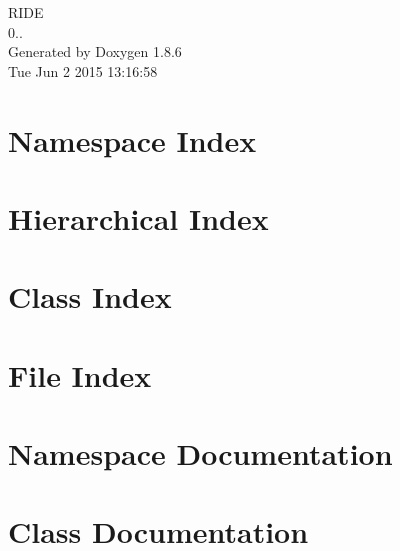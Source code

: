 \documentclass[twoside]{book}
\newcommand{\clearemptydoublepage}{%
  \newpage{\pagestyle{empty}\cleardoublepage}%
}
\begin{document}
\hypersetup{pageanchor=false}
\begin{titlepage}
\vspace*{7cm}
\begin{center}%
{\Large R\-I\-D\-E \\[1ex]\large 0.. }\\
\vspace*{1cm}
{\large Generated by Doxygen 1.8.6}\\
\vspace*{0.5cm}
{\small Tue Jun 2 2015 13:16:58}\\
\end{center}
\end{titlepage}
\clearemptydoublepage
\tableofcontents
\clearemptydoublepage
{}
\hypersetup{pageanchor=true}

\chapter{Namespace Index}

\chapter{Hierarchical Index}

\chapter{Class Index}

\chapter{File Index}

\chapter{Namespace Documentation}






\chapter{Class Documentation}






































\end{document}
